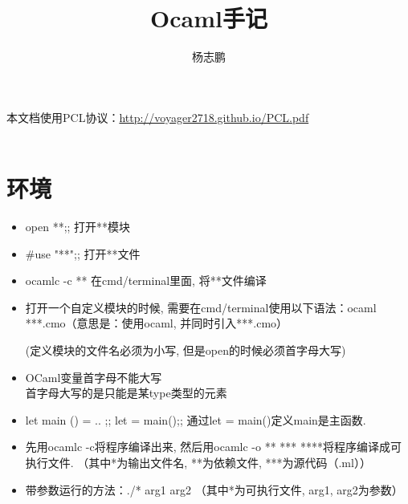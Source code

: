 \documentclass[UTF8,twocolumn]{ctexart}
\title{Ocaml手记}
\author{杨志鹏}
\date{}
\begin{document}
\maketitle
\paragraph{}
本文档使用PCL协议：\url{http://voyager2718.github.io/PCL.pdf}
\\\\
\section{环境}
\begin{itemize}
\item open **;; 打开**模块

\item \#{}use "**";; 打开**文件

\item ocamlc -c ** 在cmd/terminal里面, 将**文件编译

\item 打开一个自定义模块的时候, 需要在cmd/terminal使用以下语法：ocaml ***.cmo（意思是：使用ocaml, 并同时引入***.cmo）

(定义模块的文件名必须为小写, 但是open的时候必须首字母大写)

\item OCaml变量首字母不能大写\\
 首字母大写的是只能是某type类型的元素

\item let main () = .. ;; let \underline{ } = main();; 通过let \underline{ } = main()定义main是主函数.

\item 先用ocamlc -c将程序编译出来, 然后用ocamlc -o ** *** ****将程序编译成可执行文件. （其中*为输出文件名, **为依赖文件, ***为源代码（.ml））

\item 带参数运行的方法：./* arg1 arg2 （其中*为可执行文件, arg1, arg2为参数）
\end{itemize}
\end{document}
